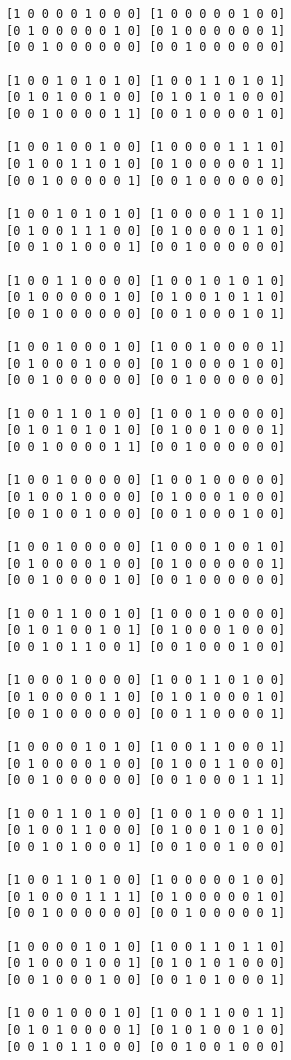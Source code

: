 \begin{lstlisting}
[1 0 0 0 0 1 0 0 0] [1 0 0 0 0 0 1 0 0] 
[0 1 0 0 0 0 0 1 0] [0 1 0 0 0 0 0 0 1] 
[0 0 1 0 0 0 0 0 0] [0 0 1 0 0 0 0 0 0] 

[1 0 0 1 0 1 0 1 0] [1 0 0 1 1 0 1 0 1] 
[0 1 0 1 0 0 1 0 0] [0 1 0 1 0 1 0 0 0] 
[0 0 1 0 0 0 0 1 1] [0 0 1 0 0 0 0 1 0] 

[1 0 0 1 0 0 1 0 0] [1 0 0 0 0 1 1 1 0] 
[0 1 0 0 1 1 0 1 0] [0 1 0 0 0 0 0 1 1] 
[0 0 1 0 0 0 0 0 1] [0 0 1 0 0 0 0 0 0] 

[1 0 0 1 0 1 0 1 0] [1 0 0 0 0 1 1 0 1] 
[0 1 0 0 1 1 1 0 0] [0 1 0 0 0 0 1 1 0] 
[0 0 1 0 1 0 0 0 1] [0 0 1 0 0 0 0 0 0] 

[1 0 0 1 1 0 0 0 0] [1 0 0 1 0 1 0 1 0] 
[0 1 0 0 0 0 0 1 0] [0 1 0 0 1 0 1 1 0] 
[0 0 1 0 0 0 0 0 0] [0 0 1 0 0 0 1 0 1] 

[1 0 0 1 0 0 0 1 0] [1 0 0 1 0 0 0 0 1] 
[0 1 0 0 0 1 0 0 0] [0 1 0 0 0 0 1 0 0] 
[0 0 1 0 0 0 0 0 0] [0 0 1 0 0 0 0 0 0] 

[1 0 0 1 1 0 1 0 0] [1 0 0 1 0 0 0 0 0] 
[0 1 0 1 0 1 0 1 0] [0 1 0 0 1 0 0 0 1] 
[0 0 1 0 0 0 0 1 1] [0 0 1 0 0 0 0 0 0] 

[1 0 0 1 0 0 0 0 0] [1 0 0 1 0 0 0 0 0] 
[0 1 0 0 1 0 0 0 0] [0 1 0 0 0 1 0 0 0] 
[0 0 1 0 0 1 0 0 0] [0 0 1 0 0 0 1 0 0] 

[1 0 0 1 0 0 0 0 0] [1 0 0 0 1 0 0 1 0] 
[0 1 0 0 0 0 1 0 0] [0 1 0 0 0 0 0 0 1] 
[0 0 1 0 0 0 0 1 0] [0 0 1 0 0 0 0 0 0] 

[1 0 0 1 1 0 0 1 0] [1 0 0 0 1 0 0 0 0] 
[0 1 0 1 0 0 1 0 1] [0 1 0 0 0 1 0 0 0] 
[0 0 1 0 1 1 0 0 1] [0 0 1 0 0 0 1 0 0] 

[1 0 0 0 1 0 0 0 0] [1 0 0 1 1 0 1 0 0] 
[0 1 0 0 0 0 1 1 0] [0 1 0 1 0 0 0 1 0] 
[0 0 1 0 0 0 0 0 0] [0 0 1 1 0 0 0 0 1] 

[1 0 0 0 0 1 0 1 0] [1 0 0 1 1 0 0 0 1] 
[0 1 0 0 0 0 1 0 0] [0 1 0 0 1 1 0 0 0] 
[0 0 1 0 0 0 0 0 0] [0 0 1 0 0 0 1 1 1] 

[1 0 0 1 1 0 1 0 0] [1 0 0 1 0 0 0 1 1] 
[0 1 0 0 1 1 0 0 0] [0 1 0 0 1 0 1 0 0] 
[0 0 1 0 1 0 0 0 1] [0 0 1 0 0 1 0 0 0] 

[1 0 0 1 1 0 1 0 0] [1 0 0 0 0 0 1 0 0] 
[0 1 0 0 0 1 1 1 1] [0 1 0 0 0 0 0 1 0] 
[0 0 1 0 0 0 0 0 0] [0 0 1 0 0 0 0 0 1] 

[1 0 0 0 0 1 0 1 0] [1 0 0 1 1 0 1 1 0] 
[0 1 0 0 0 1 0 0 1] [0 1 0 1 0 1 0 0 0] 
[0 0 1 0 0 0 1 0 0] [0 0 1 0 1 0 0 0 1] 

[1 0 0 1 0 0 0 1 0] [1 0 0 1 1 0 0 1 1] 
[0 1 0 1 0 0 0 0 1] [0 1 0 1 0 0 1 0 0] 
[0 0 1 0 1 1 0 0 0] [0 0 1 0 0 1 0 0 0] 


\end{lstlisting}
